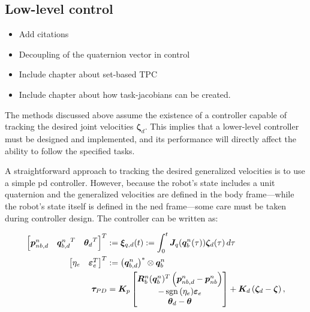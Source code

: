 \subsection{Low-level control}

{
\color{red}
\begin{itemize}
    \item Add citations
    \item Decoupling of the quaternion vector in control
    \item Include chapter about set-based TPC
    \item Include chapter about how task-jacobians can be created.
\end{itemize}
}

The methods discussed above assume the existence of a controller capable of tracking the desired joint velocities \(\bm{\zeta}_d\). This implies that a lower-level controller must be designed and implemented, and its performance will directly affect the ability to follow the specified tasks.

A straightforward approach to tracking the desired generalized velocities is to use a simple \gls{pd} controller. However, because the robot’s state includes a unit quaternion and the generalized velocities are defined in the body frame—while the robot's state itself is defined in the \gls{ned} frame—some care must be taken during controller design. The controller can be written as:

\begin{subequations}
\label{eq:tau_pd}
\begin{align}
    \begin{bmatrix}
        \bm{p}_{nb,d}^n & {\bm{q}_{b,d}^n}^T & {\bm{\theta}_d}^T
    \end{bmatrix}^T
    &:=
    \bm{\xi}_{q,d}(t) := \int_{0}^{t} \bm{J}_q(\bm{q}_b^n(\tau))\bm{\zeta}_d(\tau)\,d\tau
    \\
    \begin{bmatrix} \eta_e & \bm{\varepsilon}_e^T\end{bmatrix}^T &:= \left(\bm{q}_{b,d}^n\right)^* \otimes \bm{q}_b^n
    \\
    \bm{\tau}_{PD} &= 
    \bm{K}_p \begin{bmatrix}
        \bm{R}_b^n(\bm{q}_b^n)^T\left(\bm{p}_{nb,d}^n - \bm{p}_{nb}^n\right) \\
        -\operatorname{sgn}{(\eta_e)} \bm{\varepsilon}_e \\
        \bm{\theta}_d - \bm{\theta}
    \end{bmatrix} + 
    \bm{K}_d  \left(\bm{\zeta}_d - \bm{\zeta} \right), 
\end{align}
\end{subequations}

